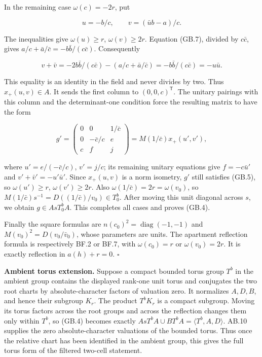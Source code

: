 \documentclass[
  11pt,
]{article}
\begin{document}
In the remaining case \(\omega(c)=-2r\), put

\[
 u=-b/c,\qquad v=(\bar u b-a)/c.
 \tag{GB.8}
\]

The inequalities give \(\omega(u)\ge r\), \(\omega(v)\ge2r\). Equation
(GB.7), divided by \(c\bar c\), gives
\(a/c+\bar a/\bar c=-b\bar b/(c\bar c)\). Consequently

\[
 v+\bar v
 =-2b\bar b/(c\bar c)-(a/c+\bar a/\bar c)
 =-b\bar b/(c\bar c)=-u\bar u.
 \tag{GB.9}
\]

This equality is an identity in the field and never divides by two. Thus
\(x_+(u,v)\in A\). It sends the first column to \((0,0,c)^{\mathsf T}\).
The unitary pairings with this column and the determinant-one condition
force the resulting matrix to have the form

\[
 g'=\begin{pmatrix}0&0&1/\bar c\\0&-\bar c/c&e\\c&f&j\end{pmatrix}
    =M(1/\bar c)x_+(u',v'),
 \tag{GB.10}
\]

where \(u'=e/(-\bar c/c)\), \(v'=j/c\); its remaining unitary equations
give \(f=-c\bar u'\) and \(v'+\bar v'=-u'\bar u'\). Since \(x_+(u,v)\)
is a norm isometry, \(g'\) still satisfies (GB.5), so
\(\omega(u')\ge r\), \(\omega(v')\ge2r\). Also
\(\omega(1/\bar c)=2r=\omega(v_0)\), so
\(M(1/\bar c)s^{-1}=D((1/\bar c)/v_0)\in T_0^b\). After moving this unit
diagonal across \(s\), we obtain \(g\in A sT_0^b A\). This completes all
cases and proves (GB.4).

Finally the square formulas are \(n(c_0)^2=\operatorname{diag}(-1,-1)\)
and \(M(v_0)^2=D(v_0/\bar v_0)\), whose parameters are units. The
apartment reflection formula is respectively BF.2 or BF.7, with
\(\omega(c_0)=r\) or \(\omega(v_0)=2r\). It is exactly reflection in
\(a(h)+r=0\). \(\square\)

\textbf{Ambient torus extension.} Suppose a compact bounded torus group
\(T^b\) in the ambient group contains the displayed rank-one unit torus
and conjugates the two root charts by absolute-character factors of
valuation zero. It normalizes \(A,D,B\), and hence their subgroup
\(K_r\). The product \(T^bK_r\) is a compact subgroup. Moving its torus
factors across the root groups and across the reflection changes them
only within \(T^b\), so (GB.4) becomes exactly
\(A sT^b A\cup B T^b A=\langle T^b,A,D\rangle\). AB.10 supplies the zero
absolute-character valuations of the bounded torus. Thus once the
relative chart has been identified in the ambient group, this gives the
full torus form of the filtered two-cell statement.
\end{document}
